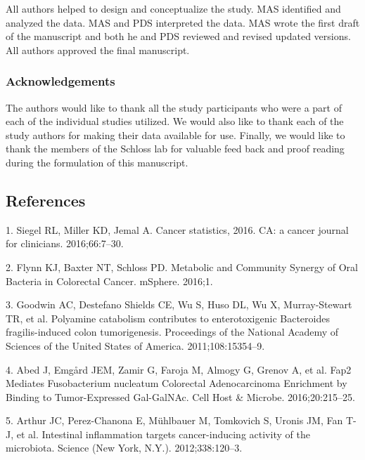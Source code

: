 \documentclass[12pt,]{article}
\begin{document}
All authors helped to design and conceptualize the study. MAS identified
and analyzed the data. MAS and PDS interpreted the data. MAS wrote the
first draft of the manuscript and both he and PDS reviewed and revised
updated versions. All authors approved the final manuscript.

\subsubsection{Acknowledgements}\label{acknowledgements}

The authors would like to thank all the study participants who were a
part of each of the individual studies utilized. We would also like to
thank each of the study authors for making their data available for use.
Finally, we would like to thank the members of the Schloss lab for
valuable feed back and proof reading during the formulation of this
manuscript.

\newpage

\subsection{References}\label{references}

\hypertarget{refs}{}
\hypertarget{ref-siegel_cancer_2016}{}
1. Siegel RL, Miller KD, Jemal A. Cancer statistics, 2016. CA: a cancer
journal for clinicians. 2016;66:7--30.

\hypertarget{ref-flynn_metabolic_2016}{}
2. Flynn KJ, Baxter NT, Schloss PD. Metabolic and Community Synergy of
Oral Bacteria in Colorectal Cancer. mSphere. 2016;1.

\hypertarget{ref-goodwin_polyamine_2011}{}
3. Goodwin AC, Destefano Shields CE, Wu S, Huso DL, Wu X, Murray-Stewart
TR, et al. Polyamine catabolism contributes to enterotoxigenic
Bacteroides fragilis-induced colon tumorigenesis. Proceedings of the
National Academy of Sciences of the United States of America.
2011;108:15354--9.

\hypertarget{ref-abed_fap2_2016}{}
4. Abed J, Emgård JEM, Zamir G, Faroja M, Almogy G, Grenov A, et al.
Fap2 Mediates Fusobacterium nucleatum Colorectal Adenocarcinoma
Enrichment by Binding to Tumor-Expressed Gal-GalNAc. Cell Host \&
Microbe. 2016;20:215--25.

\hypertarget{ref-arthur_intestinal_2012}{}
5. Arthur JC, Perez-Chanona E, Mühlbauer M, Tomkovich S, Uronis JM, Fan
T-J, et al. Intestinal inflammation targets cancer-inducing activity of
the microbiota. Science (New York, N.Y.). 2012;338:120--3.
\end{document}
